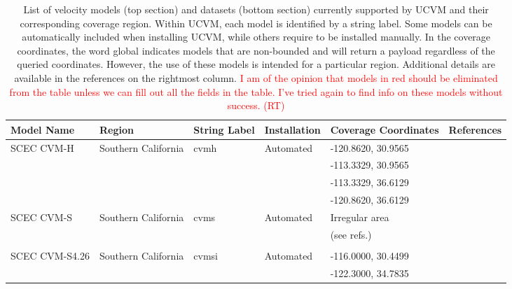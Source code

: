 
\begin{table*}[ht!]
\centering
\small
\caption{List of velocity models (top section) and datasets (bottom section) currently supported by UCVM and their corresponding coverage region. Within UCVM, each model is identified by a string label. Some models can be automatically included when installing UCVM, while others require to be installed manually. In the coverage coordinates, the word global indicates models that are non-bounded and will return a payload regardless of the queried coordinates. However, the use of these models is intended for a particular region. Additional details are available in the references on the rightmost column. \textcolor{red}{I am of the opinion that models in red should be eliminated from the table unless we can fill out all the fields in the table. I've tried again to find info on these models without success. (RT)}}
\begin{tabular}[]{llllll}
Model Name         & Region                & String Label & Installation & Coverage Coordinates & References \\
\hline
SCEC CVM-H         & Southern California   & cvmh          &  Automated   & -120.8620, 30.9565 & \citet{Suss_2003_JGR}        \\
                   &                       &               &              & -113.3329, 30.9565 & \citet{Plesch_2011_SCEC}     \\
                   &                       &               &              & -113.3329, 36.6129 & \citet{CVM-H_Manual}         \\
                   &                       &               &              & -120.8620, 36.6129 &                              \\ 
SCEC CVM-S         & Southern California   & cvms          &  Automated   & Irregular area     & \citet{Magistrale_1996_BSSA} \\
                   &                       &               &              & (see refs.)        & \citet{Magistrale_2000_BSSA} \\
                   &                       &               &              &                    & \citet{Kohler_2003_BSSA}     \\
SCEC CVM-S4.26     & Southern California   & cvmsi         &  Automated   & -116.0000, 30.4499 & \citet{Chen_2011_Proc}       \\
                   &                       &               &              & -122.3000, 34.7835 & \citet{Lee_2014_JGR}         \\

\end{tabular}
\end{table*}
